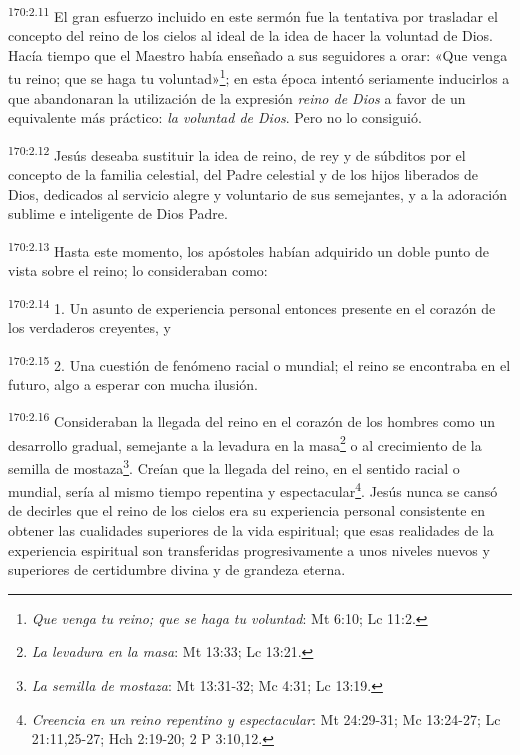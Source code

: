 \par
\textsuperscript{170:2.11} El gran esfuerzo incluido en este sermón fue la tentativa por trasladar el concepto del reino de los cielos al ideal de la idea de hacer la voluntad de Dios. Hacía tiempo que el Maestro había enseñado a sus seguidores a orar: «Que venga tu reino; que se haga tu voluntad»\footnote{\textit{Que venga tu reino; que se haga tu voluntad}: Mt 6:10; Lc 11:2.}; en esta época intentó seriamente inducirlos a que abandonaran la utilización de la expresión \textit{reino de Dios} a favor de un equivalente más práctico: \textit{la voluntad de Dios}. Pero no lo consiguió.

\par
\textsuperscript{170:2.12} Jesús deseaba sustituir la idea de reino, de rey y de súbditos por el concepto de la familia celestial, del Padre celestial y de los hijos liberados de Dios, dedicados al servicio alegre y voluntario de sus semejantes, y a la adoración sublime e inteligente de Dios Padre.

\par
\textsuperscript{170:2.13} Hasta este momento, los apóstoles habían adquirido un doble punto de vista sobre el reino; lo consideraban como:

\par
\textsuperscript{170:2.14} 1. Un asunto de experiencia personal entonces presente en el corazón de los verdaderos creyentes, y

\par
\textsuperscript{170:2.15} 2. Una cuestión de fenómeno racial o mundial; el reino se encontraba en el futuro, algo a esperar con mucha ilusión.

\par
\textsuperscript{170:2.16} Consideraban la llegada del reino en el corazón de los hombres como un desarrollo gradual, semejante a la levadura en la masa\footnote{\textit{La levadura en la masa}: Mt 13:33; Lc 13:21.} o al crecimiento de la semilla de mostaza\footnote{\textit{La semilla de mostaza}: Mt 13:31-32; Mc 4:31; Lc 13:19.}. Creían que la llegada del reino, en el sentido racial o mundial, sería al mismo tiempo repentina y espectacular\footnote{\textit{Creencia en un reino repentino y espectacular}: Mt 24:29-31; Mc 13:24-27; Lc 21:11,25-27; Hch 2:19-20; 2 P 3:10,12.}. Jesús nunca se cansó de decirles que el reino de los cielos era su experiencia personal consistente en obtener las cualidades superiores de la vida espiritual; que esas realidades de la experiencia espiritual son transferidas progresivamente a unos niveles nuevos y superiores de certidumbre divina y de grandeza eterna.

